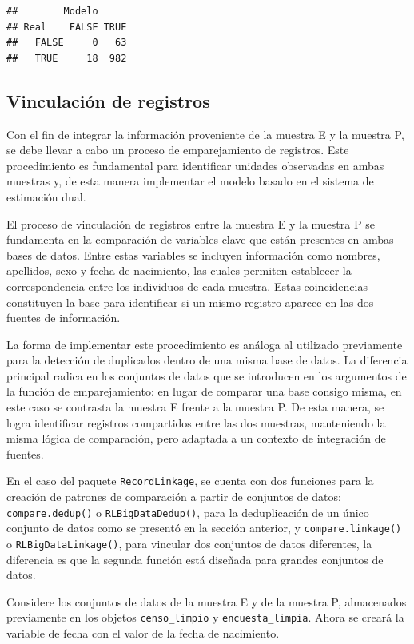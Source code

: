 \documentclass[
  12pt,
]{book}
\begin{document}
\begin{verbatim}
##        Modelo
## Real    FALSE TRUE
##   FALSE     0   63
##   TRUE     18  982
\end{verbatim}

\subsection{Vinculación de registros}\label{vinculaciuxf3n-de-registros}

Con el fin de integrar la información proveniente de la muestra E y la muestra P, se debe llevar a cabo un proceso de emparejamiento de registros. Este procedimiento es fundamental para identificar unidades observadas en ambas muestras y, de esta manera implementar el modelo basado en el sistema de estimación dual.

El proceso de vinculación de registros entre la muestra E y la muestra P se fundamenta en la comparación de variables clave que están presentes en ambas bases de datos. Entre estas variables se incluyen información como nombres, apellidos, sexo y fecha de nacimiento, las cuales permiten establecer la correspondencia entre los individuos de cada muestra. Estas coincidencias constituyen la base para identificar si un mismo registro aparece en las dos fuentes de información.

La forma de implementar este procedimiento es análoga al utilizado previamente para la detección de duplicados dentro de una misma base de datos. La diferencia principal radica en los conjuntos de datos que se introducen en los argumentos de la función de emparejamiento: en lugar de comparar una base consigo misma, en este caso se contrasta la muestra E frente a la muestra P. De esta manera, se logra identificar registros compartidos entre las dos muestras, manteniendo la misma lógica de comparación, pero adaptada a un contexto de integración de fuentes.

En el caso del paquete \texttt{RecordLinkage}, se cuenta con dos funciones para la creación de patrones de comparación a partir de conjuntos de datos: \texttt{compare.dedup()} o \texttt{RLBigDataDedup()}, para la deduplicación de un único conjunto de datos como se presentó en la sección anterior, y \texttt{compare.linkage()} o \texttt{RLBigDataLinkage()}, para vincular dos conjuntos de datos diferentes, la diferencia es que la segunda función está diseñada para grandes conjuntos de datos.

Considere los conjuntos de datos de la muestra E y de la muestra P, almacenados previamente en los objetos \texttt{censo\_limpio} y \texttt{encuesta\_limpia}. Ahora se creará la variable de fecha con el valor de la fecha de nacimiento.
\end{document}
